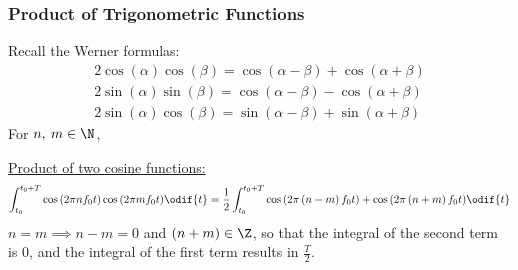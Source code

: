 \documentclass{article}
\begin{document}
\subsubsection{Product of Trigonometric Functions}
Recall the Werner formulas:
\begin{gather*}
    2 \cos{\left( \alpha \right)} \cos{\left( \beta \right)} = \cos{\left( \alpha - \beta \right)} + \cos{\left( \alpha + \beta \right)} \\
    2 \sin{\left( \alpha \right)} \sin{\left( \beta \right)} = \cos{\left( \alpha - \beta \right)} - \cos{\left( \alpha + \beta \right)} \\
    2 \sin{\left( \alpha \right)} \cos{\left( \beta \right)} = \sin{\left( \alpha - \beta \right)} + \sin{\left( \alpha + \beta \right)}
\end{gather*}
For \(n,\: m \in \N\),

\underline{Product of two cosine functions:}
\begin{equation*}
    \int_{t_0}^{t_0 + T} \cos{\left( 2\pi n f_0 t \right)} \cos{\left( 2\pi m f_0 t \right)} \odif{t} = \frac{1}{2} \int_{t_0}^{t_0 + T} \cos{\left( 2 \pi \left( n - m \right) f_0 t \right)} + \cos{\left( 2 \pi \left( n + m \right) f_0 t \right)} \odif{t}
\end{equation*}
\(n = m \implies n - m = 0\) and \(\left( n + m \right) \in \Z\), so that the integral of the second
term is \(0\), and the integral of the first term results in \(\frac{T}{2}\).
\end{document}
